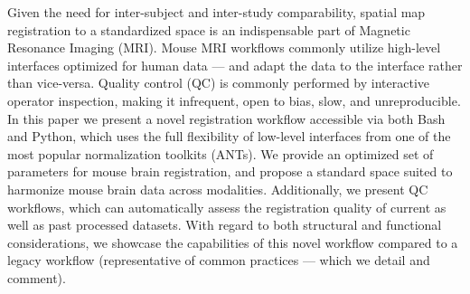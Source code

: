 Given the need for inter-subject and inter-study comparability, spatial map registration to a standardized space is an indispensable part of Magnetic Resonance Imaging (MRI).
Mouse MRI workflows commonly utilize high-level interfaces optimized for human data --- and adapt the data to the interface rather than vice-versa.
Quality control (QC) is commonly performed by interactive operator inspection, making it infrequent, open to bias, slow, and unreproducible.
In this paper we present a novel registration workflow accessible via both Bash and Python, which uses the full flexibility of low-level interfaces from one of the most popular normalization toolkits (ANTs).
We provide an optimized set of parameters for mouse brain registration, and propose a standard space suited to harmonize mouse brain data across modalities.
Additionally, we present QC workflows, which can automatically assess the registration quality of current as well as past processed datasets.
With regard to both structural and functional considerations, we showcase the capabilities of this novel workflow compared to a legacy workflow (representative of common practices --- which we detail and comment).
